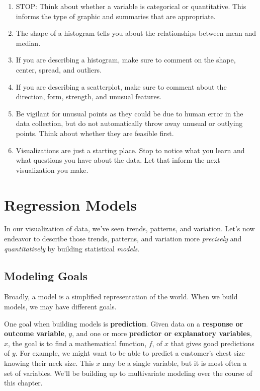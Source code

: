 \documentclass[]{book}
\begin{document}
\begin{enumerate}
\def\labelenumi{\arabic{enumi}.}
\item
  STOP: Think about whether a variable is categorical or quantitative. This informs the type of graphic and summaries that are appropriate.
\item
  The shape of a histogram tells you about the relationships between mean and median.
\item
  If you are describing a histogram, make sure to comment on the shape, center, spread, and outliers.
\item
  If you are describing a scatterplot, make sure to comment about the direction, form, strength, and unusual features.
\item
  Be vigilant for unusual points as they could be due to human error in the data collection, but do not automatically throw away unusual or outlying points. Think about whether they are feasible first.
\item
  Visualizations are just a starting place. Stop to notice what you learn and what questions you have about the data. Let that inform the next visualization you make.
\end{enumerate}

\hypertarget{regression-models}{%
\chapter{Regression Models}\label{regression-models}}

In our visualization of data, we've seen trends, patterns, and variation. Let's now endeavor to describe those trends, patterns, and variation more \emph{precisely} and \emph{quantitatively} by building statistical \emph{models}.

\hypertarget{modeling-goals}{%
\section{Modeling Goals}\label{modeling-goals}}

Broadly, a model is a simplified representation of the world. When we build models, we may have different goals.

One goal when building models is \textbf{prediction}. Given data on a \textbf{response or outcome variable}, \(y\), and one or more \textbf{predictor or explanatory variables}, \(x\), the goal is to find a mathematical function, \(f\), of \(x\) that gives good predictions of \(y\). For example, we might want to be able to predict a customer's chest size knowing their neck size. This \(x\) may be a single variable, but it is most often a set of variables. We'll be building up to multivariate modeling over the course of this chapter.
\end{document}
